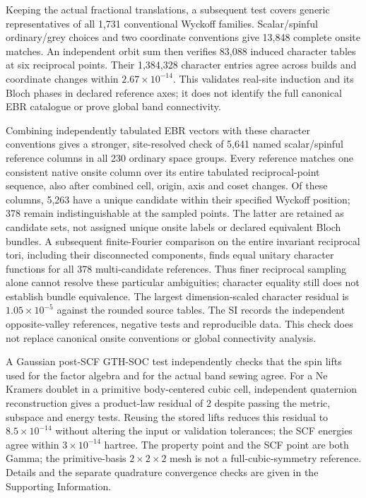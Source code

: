 Keeping the actual fractional translations, a subsequent test covers
generic representatives of all 1,731 conventional Wyckoff families.
Scalar/spinful ordinary/grey choices and two coordinate conventions
give 13,848 complete onsite matches. An independent orbit sum then
verifies 83,088 induced character tables at six reciprocal points.
Their 1,384,328 character entries agree across builds and coordinate
changes within $2.67\times10^{-14}$. This validates real-site
induction and its Bloch phases in declared reference axes; it does
not identify the full canonical EBR catalogue or prove global
band connectivity.

Combining independently tabulated EBR vectors with these character
conventions gives a stronger, site-resolved check of 5,641 named
scalar/spinful reference columns in all 230 ordinary space groups.
Every reference matches one consistent native onsite column over
its entire tabulated reciprocal-point sequence, also after combined
cell, origin, axis and coset changes. Of these columns, 5,263 have a
unique candidate within their specified Wyckoff position; 378
remain indistinguishable at the sampled points. The latter are
retained as candidate sets, not assigned unique onsite labels or
declared equivalent Bloch bundles. A subsequent finite-Fourier
comparison on the entire invariant reciprocal tori, including their
disconnected components, finds equal unitary character functions
for all 378 multi-candidate references. Thus finer reciprocal
sampling alone cannot resolve these particular ambiguities;
character equality still does not establish bundle equivalence.
The largest dimension-scaled
character residual is $1.05\times10^{-5}$ against the rounded source
tables. The SI records the independent opposite-valley references,
negative tests and reproducible data. This check does not replace
canonical onsite conventions or global connectivity analysis.

A Gaussian post-SCF GTH-SOC test independently checks that the
spin lifts used for the factor algebra and for the actual band
sewing agree. For a Ne Kramers doublet in a primitive body-centered
cubic cell, independent quaternion reconstruction gives a product-law
residual of 2 despite passing the metric, subspace and energy tests.
Reusing the stored lifts reduces this residual to
$8.5\times10^{-14}$ without altering the input or validation tolerances;
the SCF energies agree within $3\times10^{-14}$ hartree.
The property point and the SCF point are both
Gamma; the primitive-basis $2\times2\times2$ mesh is not a
full-cubic-symmetry reference. Details and the separate quadrature
convergence checks are given in the Supporting Information.

